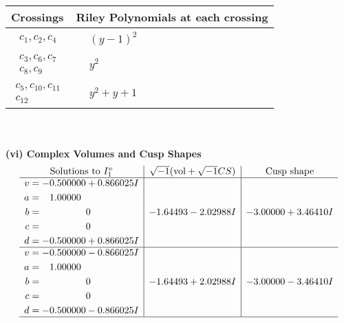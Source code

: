 \documentclass[1p]{elsarticle_modified}
\theoremstyle{definition}
\newcommand{\I}{\sqrt{-1}}
\begin{document}
\begin{tabular}{m{50pt}|m{274pt}}
Crossings & \hspace{64pt}Riley Polynomials at each crossing \\
\hline $$\begin{aligned}c_{1},c_{2},c_{4}\end{aligned}$$&$\begin{aligned}
&(y-1)^2
\end{aligned}$\\
\hline $$\begin{aligned}c_{3},c_{6},c_{7}\\c_{8},c_{9}\end{aligned}$$&$\begin{aligned}
&y^2
\end{aligned}$\\
\hline $$\begin{aligned}c_{5},c_{10},c_{11}\\c_{12}\end{aligned}$$&$\begin{aligned}
&y^2+y+1
\end{aligned}$\\
\hline
\end{tabular}\\~\\
\newpage\flushleft \textbf{(vi) Complex Volumes and Cusp Shapes}
$$\begin{array}{c|c|c}  
\text{Solutions to }I^v_{1}& \I (\text{vol} + \sqrt{-1}CS) & \text{Cusp shape}\\
 \hline 
\begin{aligned}
v &= -0.500000 + 0.866025 I \\
a &= \phantom{-}1.00000\phantom{ +0.000000I} \\
b &= \phantom{-0.000000 } 0 \\
c &= \phantom{-0.000000 } 0 \\
d &= -0.500000 + 0.866025 I\end{aligned}
 & -1.64493 - 2.02988 I & -3.00000 + 3.46410 I \\ \hline\begin{aligned}
v &= -0.500000 - 0.866025 I \\
a &= \phantom{-}1.00000\phantom{ +0.000000I} \\
b &= \phantom{-0.000000 } 0 \\
c &= \phantom{-0.000000 } 0 \\
d &= -0.500000 - 0.866025 I\end{aligned}
 & -1.64493 + 2.02988 I & -3.00000 - 3.46410 I\\
 \hline 
 \end{array}$$\newpage\newpage\renewcommand{\arraystretch}{1}
\end{document}
